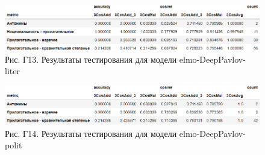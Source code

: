 \documentclass[a4paper,14pt]{article}
\begin{document}
\begin{figure}[H]
	\centering
	\includegraphics[width=0.9\linewidth]{image/res_elmo-DeepPavlov-liter }
	\caption*{Рис. Г13. Результаты тестирования для модели elmo-DeepPavlov-liter }
	\label{fig:reselmo-DeepPavlov-liter }
\end{figure}

\begin{figure}[H]
	\centering
	\includegraphics[width=0.9\linewidth]{image/res_elmo-DeepPavlov-polit }
	\caption*{Рис. Г14. Результаты тестирования для модели elmo-DeepPavlov-polit }
	\label{fig:reselmo-DeepPavlov-polit }
\end{figure}
\end{document}
